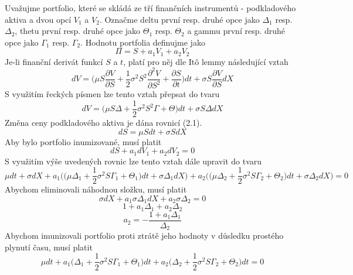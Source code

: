 \documentclass[a4paper]{book}
\begin{document}
Uvažujme portfolio, které se skládá ze tří finančních instrumentů - podkladového aktiva a dvou opcí $V_1$ a $V_2$. Označme deltu první resp. druhé opce jako $\Delta_1$ resp. $\Delta_2$, thetu první resp. druhé opce jako $\Theta_1$ resp. $\Theta_2$ a gammu první resp. druhé opce jako $\Gamma_1$ resp. $\Gamma_2$. Hodnotu portfolia definujme jako
\begin{equation*}
\Pi = S + a_1V_1 + a_2V_2
\end{equation*}
Je-li finanční derivát funkcí $S$ a $t$, platí pro něj dle It\^o lemmy následující vztah
\begin{equation*}
dV = \Bigg( \mu S \frac{\partial V}{\partial S} + \frac{1}{2}\sigma^2S^2\frac{\partial^2 V}{\partial S^2}+\frac{\partial S}{\partial t} \Bigg) dt + \sigma S \frac{\partial V}{\partial S}dX
\end{equation*}
S využitím řeckých písmen lze tento vztah přepsat do tvaru
\begin{equation*}
dV = \Bigg( \mu S \Delta + \frac{1}{2}\sigma^2S^2 \Gamma + \Theta \Bigg) dt + \sigma S \Delta dX
\end{equation*}
Změna ceny podkladového aktiva je dána rovnicí (2.1).
\begin{equation*}
dS = \mu S dt + \sigma S dX
\end{equation*}
Aby bylo portfolio inumizované, musí platit
\begin{equation*}
dS  + a_1 dV_1 + a_2 dV_2 = 0
\end{equation*}
S využitím výše uvedených rovnic lze tento vztah dále upravit do tvaru
\begin{equation*}
\mu dt + \sigma dX + a_1 \Bigg( \bigg(\mu \Delta_1 + \frac{1}{2}\sigma^2 S \Gamma_1 + \Theta_1 \bigg)dt + \sigma \Delta_1 dX \Bigg) + a_2 \Bigg( \bigg(\mu \Delta_2 + \frac{1}{2}\sigma^2 S \Gamma_2 + \Theta_2 \bigg)dt + \sigma \Delta_2 dX \Bigg) = 0
\end{equation*}
Abychom eliminovali náhodnou složku, musí platit
\begin{equation*}
\sigma dX + a_1 \sigma \Delta_1 dX + a_2 \sigma \Delta_2 = 0 
\end{equation*}
\begin{equation*}
1 + a_1 \Delta_1 + a_2 \Delta_2 
\end{equation*}
\begin{equation}
a_2 = - \frac{1 + a_1 \Delta_1}{\Delta_2}
\end{equation}
Abychom imunizovali portfolio proti ztrátě jeho hodnoty v důsledku prostého plynutí času, musí platit
\begin{equation*}
\mu dt + a_1 \bigg( \Delta_1 + \frac{1}{2}\sigma^2S \Gamma_1 + \Theta_1 \bigg) dt + a_2 \bigg( \Delta_2 + \frac{1}{2}\sigma^2S \Gamma_2 + \Theta_2 \bigg) dt = 0
\end{equation*}
\end{document}
